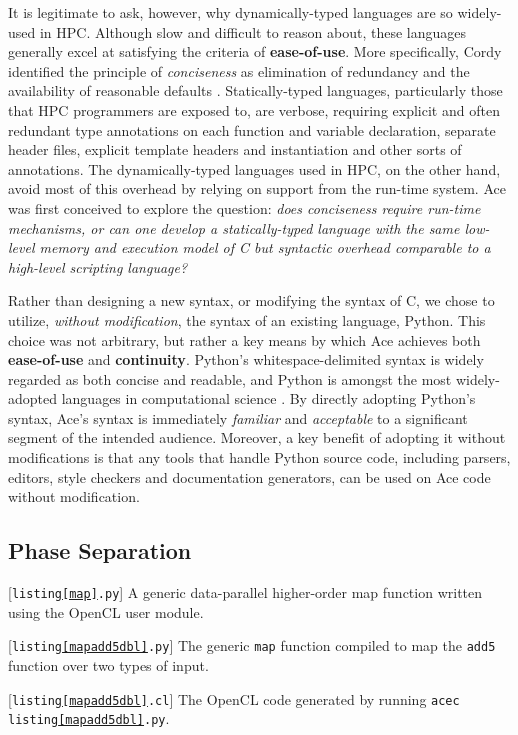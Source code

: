 \documentclass[9pt,preprint]{sigplanconf}
\begin{document}
It is legitimate to ask, however, why dynamically-typed languages are so widely-used in HPC. Although slow and difficult to reason about, these languages generally excel at satisfying the criteria of \textbf{ease-of-use}. More specifically, Cordy identified the principle of \emph{conciseness} as elimination of
redundancy and the availability of reasonable defaults \cite{cordy1992hints}. Statically-typed languages, particularly those that HPC programmers are exposed to, are verbose, requiring explicit and often redundant type annotations on each function and variable declaration, separate header files, explicit template headers and  instantiation and other sorts of annotations.  The dynamically-typed languages used in HPC, on the other hand, avoid most of this overhead by relying on support from the run-time system. Ace was first conceived to explore the question: \emph{does conciseness require run-time mechanisms, or can one develop a statically-typed language with the same low-level memory and execution model of C but syntactic overhead comparable to a high-level scripting language? }

Rather than designing a new syntax, or modifying the syntax of C, we chose to utilize, \emph{without modification}, the syntax of an existing language, Python. This choice was not arbitrary, but rather a key means by which Ace achieves both \textbf{ease-of-use} and \textbf{continuity}. Python's whitespace-delimited syntax is widely regarded as both concise and readable, and Python is amongst the most widely-adopted languages in computational science \cite{oliphant2007python}. By directly adopting Python's syntax, Ace's syntax is immediately \emph{familiar} and \emph{acceptable} to a significant segment of the intended audience. Moreover, a key benefit of adopting it without modifications is that any {tools} that handle Python source code, including parsers, editors, style checkers and documentation generators, can be used on Ace code without modification.

\subsection{Phase Separation}
\begin{codelisting}

\caption{[\texttt{listing\ref{map}.py}] A generic data-parallel higher-order map function written using the OpenCL user module.}
\label{map}
\end{codelisting}
\begin{codelisting}

\caption{[\texttt{listing\ref{mapadd5dbl}.py}] The generic \texttt{map} function compiled to map the \texttt{add5} function over two  types of input.}
\label{mapadd5dbl}
\end{codelisting}
\begin{codelisting}

\caption{[\texttt{listing\ref{mapadd5dbl}.cl}] The OpenCL code generated by running \texttt{acec listing\ref{mapadd5dbl}.py}.}
\label{mapout}
\end{codelisting}
\end{document}
